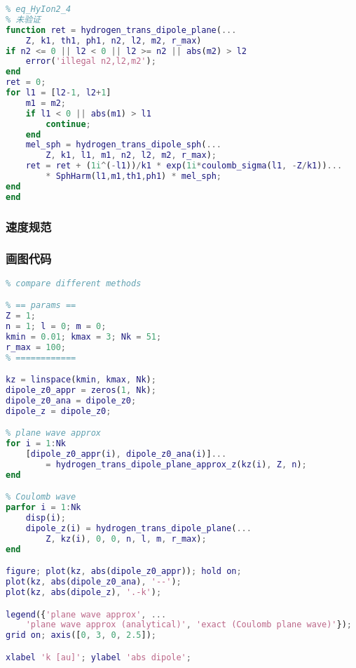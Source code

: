 \begin{lstlisting}[language=matlab, caption=hydrogen\_trans\_dipole\_plane.m]
% <\bvec k|z|n,l,m>
% eq_HyIon2_4
% 未验证
function ret = hydrogen_trans_dipole_plane(...
    Z, k1, th1, ph1, n2, l2, m2, r_max)
if n2 <= 0 || l2 < 0 || l2 >= n2 || abs(m2) > l2
    error('illegal n2,l2,m2');
end
ret = 0;
for l1 = [l2-1, l2+1]
    m1 = m2;
    if l1 < 0 || abs(m1) > l1
        continue;
    end
    mel_sph = hydrogen_trans_dipole_sph(...
        Z, k1, l1, m1, n2, l2, m2, r_max);
    ret = ret + (1i^(-l1))/k1 * exp(1i*coulomb_sigma(l1, -Z/k1))...
        * SphHarm(l1,m1,th1,ph1) * mel_sph;
end
end
\end{lstlisting}

\subsubsection{速度规范}

\subsubsection{画图代码}
\begin{lstlisting}[language=matlab,caption=plot\_hydrogen\_trans\_dipole.m]
% plot hydrogen transition dipole
% compare different methods

% == params ==
Z = 1;
n = 1; l = 0; m = 0;
kmin = 0.01; kmax = 3; Nk = 51;
r_max = 100;
% ============

kz = linspace(kmin, kmax, Nk);
dipole_z0_appr = zeros(1, Nk);
dipole_z0_ana = dipole_z0;
dipole_z = dipole_z0;

% plane wave approx
for i = 1:Nk
    [dipole_z0_appr(i), dipole_z0_ana(i)]...
        = hydrogen_trans_dipole_plane_approx_z(kz(i), Z, n);
end

% Coulomb wave
parfor i = 1:Nk
    disp(i);
    dipole_z(i) = hydrogen_trans_dipole_plane(...
        Z, kz(i), 0, 0, n, l, m, r_max);
end

figure; plot(kz, abs(dipole_z0_appr)); hold on;
plot(kz, abs(dipole_z0_ana), '--');
plot(kz, abs(dipole_z), '.-k');

legend({'plane wave approx', ...
    'plane wave approx (analytical)', 'exact (Coulomb plane wave)'});
grid on; axis([0, 3, 0, 2.5]);

xlabel 'k [au]'; ylabel 'abs dipole';
\end{lstlisting}
